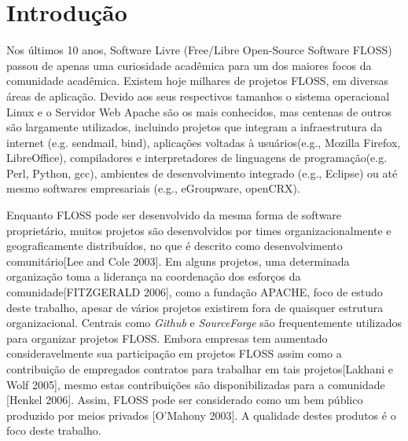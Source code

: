 \chapter{Introdução}
\label{chapter:intro}


Nos últimos 10 anos, Software Livre (Free/Libre Open-Source    Software FLOSS) passou de apenas uma curiosidade acadêmica para um dos maiores focos da comunidade acadêmica. Existem hoje milhares de projetos FLOSS, em diversas áreas de aplicação. Devido aos seus respectivos tamanhos o sistema operacional Linux e o Servidor Web Apache são os mais conhecidos, mas centenas de outros são largamente utilizados, incluindo projetos que integram a infraestrutura da internet (e.g. sendmail, bind), aplicações voltadas à usuários(e.g., Mozilla Firefox, LibreOffice), compiladores e interpretadores de linguagens de programação(e.g. Perl, Python, gcc), ambientes de desenvolvimento integrado (e.g., Eclipse) ou até mesmo softwares empresariais (e.g., eGroupware, openCRX).



Enquanto FLOSS pode ser desenvolvido da mesma forma de software proprietário, muitos projetos são desenvolvidos por times organizacionalmente e geograficamente distribuídos, no que é descrito como desenvolvimento comunitário[Lee and Cole 2003]. Em alguns projetos, uma determinada organização toma a liderança na coordenação dos esforços da comunidade[FITZGERALD 2006], como a fundação APACHE, foco de estudo deste trabalho, apesar de vários projetos existirem fora de quaisquer estrutura organizacional. Centrais como \textit{Github} e \textit{SourceForge} são frequentemente utilizados para organizar projetos FLOSS. Embora empresas tem aumentado consideravelmente sua participação em projetos FLOSS assim como a contribuição de empregados contratos para trabalhar em tais projetos[Lakhani e Wolf 2005], mesmo estas contribuições são disponibilizadas para a comunidade [Henkel 2006]. Assim, FLOSS pode ser considerado como um bem público produzido por meios privados [O'Mahony 2003]. A qualidade destes produtos é o foco deste trabalho.


